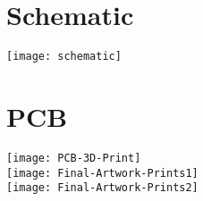 \section{Schematic}
\texttt{[image: schematic]}

\section{PCB}
\texttt{[image: PCB-3D-Print]}\\
\texttt{[image: Final-Artwork-Prints1]}\\
\texttt{[image: Final-Artwork-Prints2]}